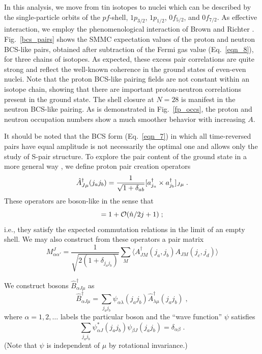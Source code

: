 \documentclass[rmp,aps,floatfix]{revtex4}
\begin{document}
In this analysis, we move from tin isotopes to nuclei which can
be described by the single-particle orbits of the $pf$-shell,
$1p_{3/2}$, $1p_{1/2}$, $0f_{5/2}$, and $0f_{7/2}$.
As effective interaction, we employ the phenomenological interaction of 
Brown and Richter \cite{Richter}.
Fig.~\ref{bcs_pairs} 
shows the SMMC expectation values of the proton and neutron
BCS-like pairs,
obtained after subtraction of the Fermi gas value (Eq.~\ref{eqn_8}), for three
chains of isotopes. As expected, these excess pair correlations are quite
strong and reflect the well-known coherence in the ground states
of even-even nuclei. Note that the proton BCS-like pairing fields are not
constant within an isotope chain, showing that there are important
proton-neutron correlations present in the ground state. The shell closure
at $N=28$ is manifest in the neutron BCS-like pairing. As is demonstrated
in Fig.~\ref{fp_occs}, the proton and neutron occupation numbers show a
much smoother behavior
with increasing $A$.





It should be noted that the BCS form (Eq.~\ref{eqn_7}) in which all
time-reversed pairs have equal amplitude is not necessarily the optimal one
and allows only the study of S-pair structure.
To explore the pair content of the ground state in 
a more general way \cite{gsoft96,Langanke95b},
we define proton pair
creation operators
\begin{equation}\hat{A}^\dagger_{J\mu}(j_aj_b)=
{1\over\sqrt{1+\delta_{ab}}}
[a^\dagger_{j_a}\times a^\dagger_{j_b}]_{J\mu}\;.
\end{equation}
These operators are boson-like in the sense that
\begin{equation}[\hat{A}^\dagger_{J\mu}
(j_aj_b),
\hat{A}_{J\mu} (j_aj_b)]=1
+{\cal O}(\hat n/2j+1)\;;
\end{equation}
i.e., they satisfy the expected commutation relations in the limit of an
empty shell. We may also construct from these operators a pair matrix
\begin{equation}
M^J_{\alpha\alpha'}=\frac{1}{\sqrt{2(1+\delta_{j_aj_b})}}\sum_M\langle
A^\dagger_{JM}(j_a,j_b)A_{JM}(j_c,j_d)\rangle
\label{pair_matrix}
\end{equation}

We construct bosons $\hat{B}^\dagger_{\alpha J\mu}$ as
\begin{equation}\hat{B}^\dagger_{\alpha J\mu}=
\sum_{j_aj_b}\psi_{\alpha\lambda}(j_aj_b)
\hat{A}^\dagger_{\lambda\mu}(j_aj_b)\;,
\end{equation}
where $\alpha=1,2,\ldots$ labels the particular boson and the ``wave
function'' $\psi$ satisfies
\begin{equation}\sum_{j_aj_b} \psi^\ast_{\alpha J}(j_aj_b)
\psi_{\beta J}(j_aj_b)=\delta_{\alpha\beta}\;.
\end{equation}
(Note that $\psi$ is independent of $\mu$ by rotational invariance.)
\end{document}
